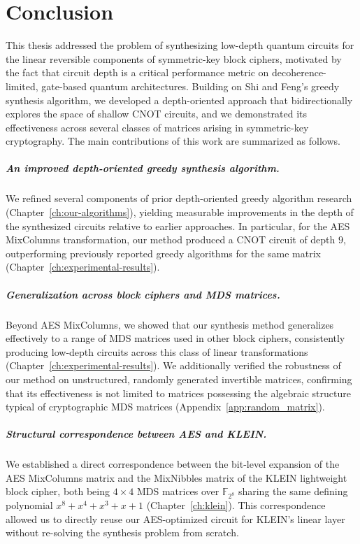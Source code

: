 \chapter{Conclusion}
\label{ch:conclusion}

This thesis addressed the problem of synthesizing low-depth quantum circuits for the linear reversible components of symmetric-key block ciphers, motivated by the fact that circuit depth is a critical performance metric on decoherence-limited, gate-based quantum architectures. Building on Shi and Feng's greedy synthesis algorithm, we developed a depth-oriented approach that bidirectionally explores the space of shallow CNOT circuits, and we demonstrated its effectiveness across several classes of matrices arising in symmetric-key cryptography. The main contributions of this work are summarized as follows.

\paragraph{An improved depth-oriented greedy synthesis algorithm.}
We refined several components of prior depth-oriented greedy algorithm research (Chapter~\ref{ch:our-algorithms}), yielding measurable improvements in the depth of the synthesized circuits relative to earlier approaches. In particular, for the AES MixColumns transformation, our method produced a CNOT circuit of depth $9$, outperforming previously reported greedy algorithms for the same matrix (Chapter~\ref{ch:experimental-results}).

\paragraph{Generalization across block ciphers and MDS matrices.}
Beyond AES MixColumns, we showed that our synthesis method generalizes effectively to a range of MDS matrices used in other block ciphers, consistently producing low-depth circuits across this class of linear transformations (Chapter~\ref{ch:experimental-results}). We additionally verified the robustness of our method on unstructured, randomly generated invertible matrices, confirming that its effectiveness is not limited to matrices possessing the algebraic structure typical of cryptographic MDS matrices (Appendix~\ref{app:random_matrix}).

\paragraph{Structural correspondence between AES and KLEIN.}
We established a direct correspondence between the bit-level expansion of the AES MixColumns matrix and the MixNibbles matrix of the KLEIN lightweight block cipher, both being $4 \times 4$ MDS matrices over $\mathbb{F}_{2^8}$ sharing the same defining polynomial $x^{8} + x^{4} + x^{3} + x + 1$ (Chapter~\ref{ch:klein}). This correspondence allowed us to directly reuse our AES-optimized circuit for KLEIN's linear layer without re-solving the synthesis problem from scratch.

